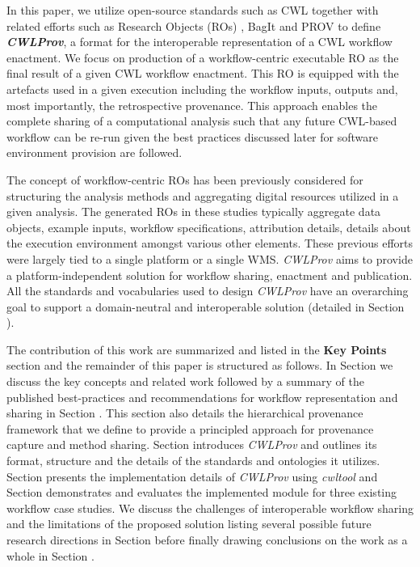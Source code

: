\documentclass[a4paper,num-refs]{oup-contemporary}
\begin{document}
In this paper, we utilize open-source standards such as CWL together with related efforts such as Research Objects (ROs) \citep{belhajjame_2015}, BagIt \citep{bagit17} and PROV \citep{Missier2013} to define \textbf{\textit{CWLProv}}, a format for the interoperable representation of a CWL workflow enactment. We focus on production of a workflow-centric executable RO as the final result of a given CWL workflow enactment. This RO is equipped with the artefacts used in a given execution including the workflow inputs, outputs and, most importantly, the retrospective provenance. This approach enables the complete sharing of a computational analysis such that any future CWL-based workflow can be re-run given the best practices discussed later for software environment provision are followed.

The concept of workflow-centric ROs has been previously considered \citep{belhajjame_2015, hettne_2014, belhajjame_2012} for structuring the analysis methods and aggregating digital resources utilized in a given analysis. The generated ROs in these studies typically aggregate data objects, example inputs, workflow specifications, attribution details, details about the execution environment amongst various other elements. These previous efforts were largely tied to a single platform or a single WMS. \textit{CWLProv} aims to provide a platform-independent solution for workflow sharing, enactment and publication. All the standards and vocabularies used to design \textit{CWLProv} have an overarching goal to support a domain-neutral and interoperable solution (detailed in Section \textbf{}). 

The contribution of this work are summarized and listed in the \textbf{Key Points} section and the remainder of this paper is structured as follows. In Section \textbf{} we discuss the key concepts and related work followed by a summary of the published best-practices and recommendations for workflow representation and sharing in Section \textbf{}. This section also details the hierarchical provenance framework that we define to provide a principled approach for provenance capture and method sharing. Section \textbf{} introduces \textit{CWLProv} and outlines its format, structure and the details of the standards and ontologies it utilizes. Section \textbf{} presents the implementation details of \textit{CWLProv} using \textit{cwltool} \citep{cwltool} and Section \textbf{} demonstrates and evaluates the implemented module for three existing workflow case studies. We discuss the challenges of interoperable workflow sharing and the limitations of the proposed solution listing several possible future research directions in Section \textbf{} before finally drawing conclusions on the work as a whole in Section \textbf{}.
\end{document}
